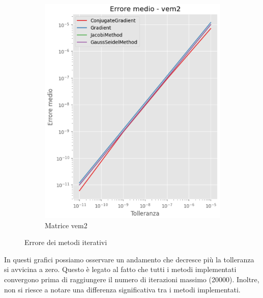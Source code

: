 \begin{figure}[!ht]
\begin{subfigure}{0.45\textwidth}
        \includegraphics[width=\textwidth]{./../report/Progetto_1_bis/img/error_vem2.png}
        \caption{Matrice vem2}
        \label{fig:error_vem2}
    \end{subfigure}
    \caption{Errore dei metodi iterativi}
    \label{fig:error}
\end{figure}

In questi grafici possiamo osservare un andamento che decresce più la tolleranza
si avvicina a zero. Questo è legato al fatto che tutti i metodi implementati
convergono prima di raggiungere il numero di iterazioni massimo (20000). Inoltre,
non si riesce a notare una differenza significativa tra i metodi implementati.

